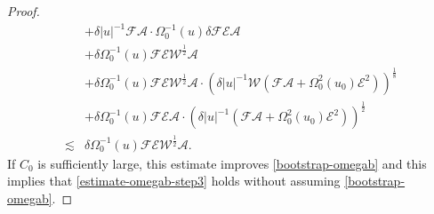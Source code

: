 \documentclass[11pt,reqno]{amsart}
\theoremstyle{definition}
\numberwithin{equation}{section}
\begin{document}
\begin{proof}
\begin{equation}
\begin{split}
&+\delta|u|^{-1}\mathscr{F}\mathcal{A}\cdot\Omega_0^{-1}(u)\delta\mathscr{F}\mathscr{E}\mathcal{A}\\
&+\delta\Omega_0^{-1}(u)\mathscr{F}\mathscr{E}\mathscr{W}^{\frac{1}{2}}\mathcal{A}\\
&+\delta\Omega_0^{-1}(u)\mathscr{F}\mathscr{E}\mathscr{W}^{\frac{1}{2}}\mathcal{A}\cdot\left(\delta|u|^{-1}\mathscr{W}(\mathscr{F}\mathcal{A}+\Omega_0^2(u_0)\mathscr{E}^2)\right)^{\frac{1}{8}}\\
&+\delta\Omega_0^{-1}(u)\mathscr{F}\mathscr{E}\mathcal{A}\cdot(\delta|u|^{-1}(\mathscr{F}\mathcal{A}+\Omega_0^2(u_0)\mathscr{E}^2))^{\frac{1}{2}}\\
\lesssim&\delta\Omega_0^{-1}(u)\mathscr{F}\mathscr{E}\mathscr{W}^{\frac{1}{2}}\mathcal{A}.
\end{split}
\end{equation}
If $C_0$ is sufficiently large, this estimate improves \eqref{bootstrap-omegab} and this implies that \eqref{estimate-omegab-step3} holds without assuming \eqref{bootstrap-omegab}.


\end{proof}
\end{document}
